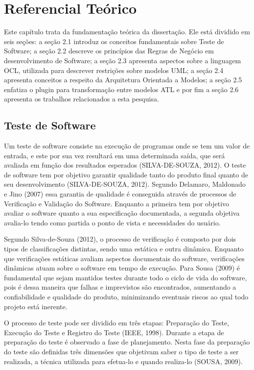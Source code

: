 \chapter{Referencial Teórico}

Este capítulo trata da fundamentação teórica da dissertação. Ele está dividido em seis seções: a seção 2.1 introduz os conceitos fundamentais sobre Teste de Software; a seção 2.2 descreve os princípios das Regras de Negócio em desenvolvimento de Software; a seção 2.3 apresenta aspectos sobre a linguagem OCL, utilizada para descrever restrições sobre modelos UML; a seção 2.4 apresenta conceitos a respeito da Arquitetura Orientada a Modelos; a seção 2.5 enfatiza o plugin para transformação entre modelos ATL e por fim a seção 2.6 apresenta os trabalhos relacionados a esta pesquisa.

\section{Teste de Software}


Um teste de software consiste na execução de programas onde se tem um valor de entrada, e este por sua vez resultará em uma determinada saída, que será avaliada em função dos resultados esperados (SILVA-DE-SOUZA, 2012). O teste de software tem por objetivo garantir qualidade tanto do produto final quanto de seu desenvolvimento (SILVA-DE-SOUZA, 2012). Segundo Delamaro, Maldonado e Jino (2007) essa garantia de qualidade é conseguida através de processos de Verificação e Validação do Software. Enquanto a primeira tem por objetivo avaliar o software quanto a sua especificação documentada, a segunda objetiva avalia-lo tendo como partida o ponto de vista e necessidades do usuário.


Segundo Silva-de-Souza (2012), o processo de verificação é composto por dois tipos de classificações distintas, sendo uma estática e outra dinâmica. Enquanto que verificações estáticas avaliam aspectos documentais do software, verificações dinâmicas atuam sobre o software em tempo de execução. Para Sousa (2009) é fundamental que sejam mantidos testes durante todo o ciclo de vida do software, pois é dessa maneira que falhas e imprevistos são encontrados, aumentando a confiabilidade e qualidade do produto, minimizando eventuais riscos ao qual todo projeto está inerente.


O processo de teste pode ser dividido em três etapas: Preparação do Teste, Execução do Teste e Registro do Teste (IEEE, 1998). Durante a etapa de preparação do teste é observado a fase de planejamento. Nesta fase da preparação do teste são definidas três dimensões que objetivam saber o tipo de teste a ser realizada, a técnica utilizada para efetua-lo e quando realiza-lo (SOUSA, 2009).


